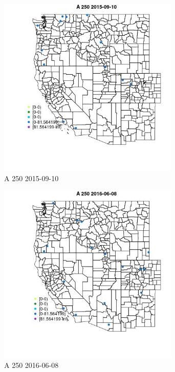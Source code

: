 \begin{figure} 
\centering  
\includegraphics[width=0.77\textwidth]{Code_Outputs/Report_ML_input_PM25_Step4_part_e_de_duplicated_aves_MapObsA_2502015-09-10.jpg} 
\caption{\label{fig:Report_ML_input_PM25_Step4_part_e_de_duplicated_avesMapObsA_2502015-09-10}A 250 2015-09-10} 
\end{figure} 
 

\begin{figure} 
\centering  
\includegraphics[width=0.77\textwidth]{Code_Outputs/Report_ML_input_PM25_Step4_part_e_de_duplicated_aves_MapObsA_2502016-06-08.jpg} 
\caption{\label{fig:Report_ML_input_PM25_Step4_part_e_de_duplicated_avesMapObsA_2502016-06-08}A 250 2016-06-08} 
\end{figure} 
 

